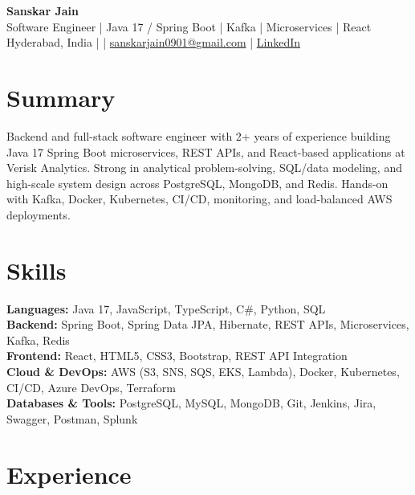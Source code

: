 \documentclass[10pt,letterpaper]{article}
\begin{document}
\begin{center}
    {\Large \textbf{Sanskar Jain}} \\
    Software Engineer \;|\; Java 17 / Spring Boot \;|\; Kafka \;|\; Microservices \;|\; React \\
    Hyderabad, India \enspace |  \enspace | \enspace
    \href{mailto:sanskarjain0901@gmail.com}{sanskarjain0901@gmail.com} \enspace | \enspace
    \href{https://www.linkedin.com/in/sanskar-jain0901/}{LinkedIn}
\end{center}

\vspace{2pt}

\section*{Summary}
Backend and full-stack software engineer with 2+ years of experience building Java 17 Spring Boot microservices, REST APIs, and React-based applications at Verisk Analytics. Strong in analytical problem-solving, SQL/data modeling, and high-scale system design across PostgreSQL, MongoDB, and Redis. Hands-on with Kafka, Docker, Kubernetes, CI/CD, monitoring, and load-balanced AWS deployments.

\section*{Skills}
\textbf{Languages:} Java 17, JavaScript, TypeScript, C\#, Python, SQL \\
\textbf{Backend:} Spring Boot, Spring Data JPA, Hibernate, REST APIs, Microservices, Kafka, Redis \\
\textbf{Frontend:} React, HTML5, CSS3, Bootstrap, REST API Integration \\
\textbf{Cloud \& DevOps:} AWS (S3, SNS, SQS, EKS, Lambda), Docker, Kubernetes, CI/CD, Azure DevOps, Terraform \\
\textbf{Databases \& Tools:} PostgreSQL, MySQL, MongoDB, Git, Jenkins, Jira, Swagger, Postman, Splunk

\section*{Experience}
\end{document}
